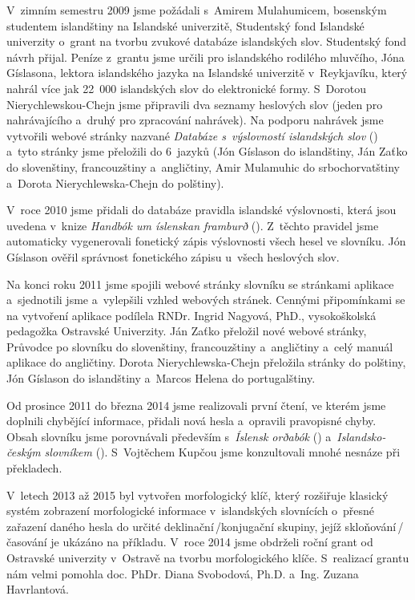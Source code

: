 V~zimním semestru 2009 jsme požádali s~Amirem Mulahumicem, bosenským studentem islandštiny na Islandské univerzitě, Studentský fond Islandské univerzity o~grant na tvorbu zvukové databáze islandských slov. 
Studentský fond návrh přijal. Peníze z~grantu jsme určili pro islandského rodilého mluvčího, Jóna Gíslasona, lektora islandského jazyka na Islandské univerzitě v~Reykjavíku, který nahrál více jak 22~000 islandských slov do elektronické formy. 
S~Dorotou Nierychlewskou-Chejn jsme připravili dva seznamy heslových slov (jeden pro nahrávajícího a~druhý pro zpracování nahrávek). Na podporu nahrávek jsme vytvořili webové stránky nazvané \textit{Databáze s~výslovností islandských slov} (\cite {int13}) a~tyto stránky jsme přeložili do 6~jazyků (Jón Gíslason do islandštiny, Ján Zaťko do slovenštiny, francouzštiny a~angličtiny, Amir Mulamuhic do srbochorvatštiny a~Dorota Nierychlewska-Chejn do polštiny).

V~roce 2010 jsme přidali do databáze pravidla islandské výslovnosti, která jsou uvedena v~knize \textit{Handbók um íslenskan framburð} (\cite {is2}). Z~těchto pravidel jsme automaticky vygenerovali fonetický zápis výslovnosti všech hesel ve slovníku. 
Jón Gíslason ověřil správnost fonetického zápisu u~všech heslových slov.

Na konci roku 2011 jsme spojili webové stránky slovníku se stránkami aplikace a~sjednotili jsme a~vylepšili vzhled webových stránek. Cennými připomínkami se na vytvoření aplikace podílela
RNDr. Ingrid Nagyová, PhD., vysokoškolská pedagožka Ostravské Univerzity. Ján Zaťko přeložil nové webové stránky, Průvodce po slovníku do slovenštiny, francouzštiny a~angličtiny a~celý manuál aplikace do angličtiny. 
Dorota Nierychlewska-Chejn přeložila stránky do polštiny, Jón Gíslason do islandštiny a~Marcos Helena do portugalštiny.

Od prosince 2011 do března 2014 jsme realizovali první čtení, ve kterém jsme doplnili chybějící informace, přidali nová hesla a~opravili pravopisné chyby. 
Obsah slovníku jsme porovnávali především s~\textit{Íslensk orðabók}  (\cite {is}) a~\textit{Islandsko-českým slovníkem} (\cite {is7}). S~Vojtěchem Kupčou jsme konzultovali mnohé nesnáze při překladech.

V~letech 2013 až 2015 byl vytvořen morfologický klíč, který rozšiřuje klasický systém zobrazení morfologické informace v~islandských slovnících o~přesné zařazení daného hesla do určité deklinační\,/\addthin konjugační skupiny, jejíž
skloňování\,/\addthin časování je ukázáno na příkladu. V~roce 2014 jsme obdrželi roční grant od Ostravské univerzity v~Ostravě na tvorbu morfologického klíče. S~realizací grantu nám velmi pomohla doc. PhDr. Diana Svobodová, Ph.D. a~Ing. Zuzana Havrlantová.

